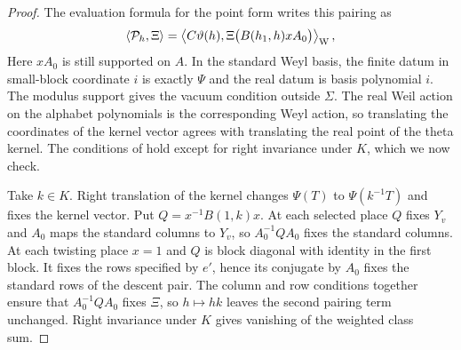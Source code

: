 \begin{proof}
The evaluation formula for the point form writes this pairing as
\[
 \langle\mathcal P_h,\Xi\rangle=
 \left\langle C\vartheta(h),\Xi\bigl(B(h_1,h)xA_0\bigr)\right\rangle_{\rm W},
\]
Here $xA_0$ is still supported on $A$. In the standard Weyl basis, the finite datum in small-block coordinate $i$ is exactly $\Psi$ and the real datum is basis polynomial $i$. The modulus support gives the vacuum condition outside $\Sigma$. The real Weil action on the alphabet polynomials is the corresponding Weyl action, so translating the coordinates of the kernel vector agrees with translating the real point of the theta kernel. The conditions of  hold except for right invariance under $K$, which we now check.

Take $k\in K$. Right translation of the kernel changes $\Psi(T)$ to $\Psi(k^{-1}T)$ and fixes the kernel vector. Put $Q=x^{-1}B(1,k)x$. At each selected place $Q$ fixes $Y_v$ and $A_0$ maps the standard columns to $Y_v$, so $A_0^{-1}QA_0$ fixes the standard columns. At each twisting place $x=1$ and $Q$ is block diagonal with identity in the first block. It fixes the rows specified by $e'$, hence its conjugate by $A_0$ fixes the standard rows of the descent pair. The column and row conditions together ensure that $A_0^{-1}QA_0$ fixes $\Xi$, so $h\mapsto hk$ leaves the second pairing term unchanged. Right invariance under $K$ gives vanishing of the weighted class sum.
\end{proof}

